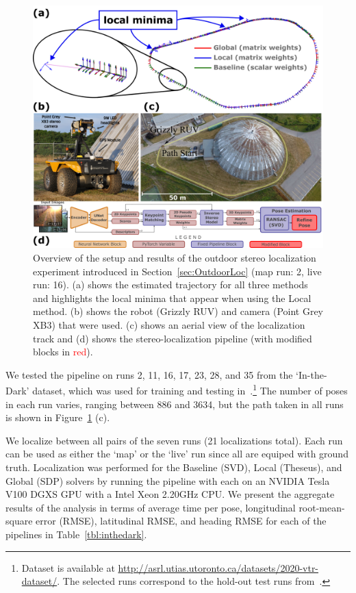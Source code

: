\documentclass[lettersize,journal]{IEEEtran}
\begin{document}
\begin{figure}[]
	\centering
	\includegraphics[width=\columnwidth]{figs/in-the-dark-traj.png}
	\caption{Overview of the setup and results of the outdoor stereo localization experiment introduced in Section~\ref{sec:OutdoorLoc} (map run: 2, live run: 16). (a) shows the estimated trajectory for all three methods and highlights the local minima that appear when using the Local method. (b) shows the robot (Grizzly RUV) and camera (Point Grey XB3) that were used. (c) shows an aerial view of the localization track and (d) shows the stereo-localization pipeline (with modified blocks in \textcolor{red}{red}).}
	\label{fig:inthedark}
\end{figure}

We tested the pipeline on runs 2, 11, 16, 17, 23, 28, and 35 from the `In-the-Dark' dataset, which was used for training and testing in~\cite{gridsethKeepingEyeThings2022}.\footnote{Dataset is available at \url{http://asrl.utias.utoronto.ca/datasets/2020-vtr-dataset/}. The selected runs correspond to the hold-out test runs from~\cite{gridsethKeepingEyeThings2022}.} The number of poses in each run varies, ranging between 886 and 3634, but the path taken in all runs is shown in Figure~\ref{fig:inthedark} (c). 

We localize between all pairs of the seven runs (21 localizations total). Each run can be used as either the `map' or the `live' run since all are equiped with ground truth. Localization was performed for the Baseline (SVD), Local (Theseus), and Global (SDP) solvers by running the pipeline with each on an NVIDIA Tesla V100 DGXS GPU with a Intel Xeon 2.20GHz CPU. We present the aggregate results of the analysis in terms of average time per pose, longitudinal root-mean-square error (RMSE), latitudinal RMSE, and heading RMSE for each of the pipelines in Table~\ref{tbl:inthedark}. 
\end{document}
